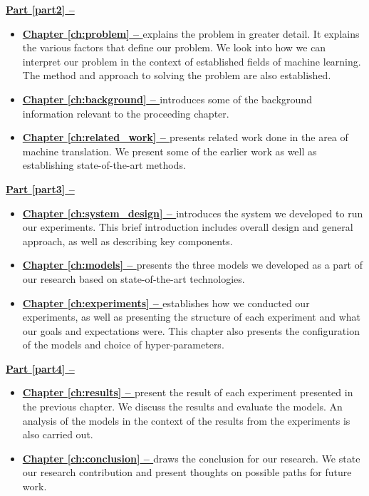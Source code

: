 \noindent
\textbf{{\hyperref[part2]{Part \ref{part2} -- }}}
\begin{itemize}
    \item\textbf{\hyperref[ch:problem]{Chapter \ref{ch:problem} -- }} explains the problem in greater detail. It explains the various factors that define our problem. We look into how we can interpret our problem in the context of established fields of machine learning. The method and approach to solving the problem are also established.
    \item\textbf{\hyperref[ch:background]{Chapter \ref{ch:background} -- }} introduces some of the background information relevant to the proceeding chapter.
    \item\textbf{\hyperref[ch:related_work]{Chapter \ref{ch:related_work} -- }} presents related work done in the area of machine translation. We present some of the earlier work as well as establishing state-of-the-art methods.
\end{itemize}

\noindent
\textbf{{\hyperref[part3]{Part \ref{part3} -- }}}
\begin{itemize}
    \item\textbf{\hyperref[ch:system_design]{Chapter \ref{ch:system_design} -- }} introduces the system we developed to run our experiments. This brief introduction includes overall design and general approach, as well as describing key components.
    \item\textbf{\hyperref[ch:models]{Chapter \ref{ch:models} -- }} presents the three models we developed as a part of our research based on state-of-the-art technologies.
    \item\textbf{\hyperref[ch:experiments]{Chapter \ref{ch:experiments} -- }} establishes how we conducted our experiments, as well as presenting the structure of each experiment and what our goals and expectations were. This chapter also presents the configuration of the models and choice of hyper-parameters.
\end{itemize}

\newpage
\noindent
\textbf{{\hyperref[part4]{Part \ref{part4} -- }}}
\begin{itemize}
    \item\textbf{\hyperref[ch:results]{Chapter \ref{ch:results} -- }} present the result of each experiment presented in the previous chapter. We discuss the results and evaluate the models. An analysis of the models in the context of the results from the experiments is also carried out.
    \item\textbf{\hyperref[ch:conclusion]{Chapter \ref{ch:conclusion} -- }} draws the conclusion for our research. We state our research contribution and present thoughts on possible paths for future work.
\end{itemize}